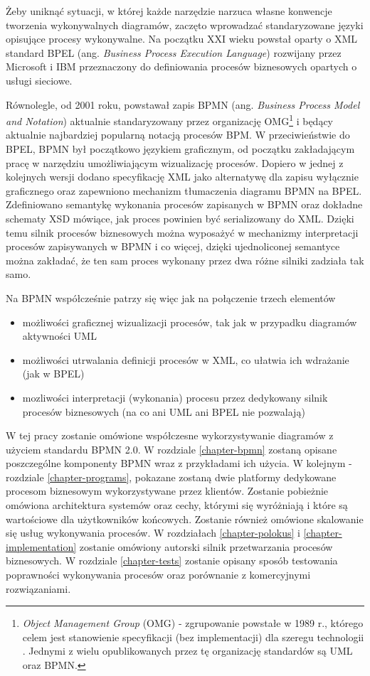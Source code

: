 \documentclass[declaration,shortabstract,mgr]{iithesis}
\newcommand{\bpmn}{BPMN }
\begin{document}
Żeby uniknąć sytuacji, w której każde narzędzie narzuca własne konwencje tworzenia wykonywalnych diagramów, zaczęto wprowadzać standaryzowane języki opisujące procesy wykonywalne. Na początku XXI wieku powstał oparty o XML standard BPEL (ang. \textit{Business Process Execution Language}) rozwijany przez Microsoft i IBM przeznaczony do definiowania procesów biznesowych opartych o usługi sieciowe.

Równolegle, od 2001 roku, powstawał zapis \bpmn (ang. \textit{Business Process Model and Notation}) aktualnie standaryzowany przez organizację OMG\footnote{\textit{Object Management Group} (OMG) - zgrupowanie powstałe w 1989 r., którego celem jest stanowienie specyfikacji (bez implementacji) dla szeregu technologii \cite{omg-wiki}. Jednymi z wielu opublikowanych przez tę organizację standardów są UML oraz BPMN.} i będący aktualnie najbardziej popularną notacją procesów BPM. W przeciwieństwie do BPEL, BPMN był początkowo językiem graficznym, od początku zakładającym pracę w narzędziu umożliwiającym wizualizację procesów. Dopiero w jednej z kolejnych wersji dodano specyfikację XML jako alternatywę dla zapisu wyłącznie graficznego oraz zapewniono mechanizm tłumaczenia diagramu \bpmn na BPEL. Zdefiniowano semantykę wykonania procesów zapisanych w \bpmn oraz dokładne schematy XSD mówiące, jak proces powinien być serializowany do XML. Dzięki temu silnik procesów biznesowych można wyposażyć w mechanizmy interpretacji procesów zapisywanych w \bpmn i co więcej, dzięki ujednoliconej semantyce można zakładać, że ten sam proces wykonany przez dwa różne silniki zadziała tak samo. 

Na \bpmn współcześnie patrzy się więc jak na połączenie trzech elementów

\begin{itemize}
\item możliwości graficznej wizualizacji procesów, tak jak w przypadku diagramów aktywności UML
\item możliwości utrwalania definicji procesów w XML, co ułatwia ich wdrażanie (jak w BPEL)
\item mozliwości interpretacji (wykonania) procesu przez dedykowany silnik procesów biznesowych (na co ani UML ani BPEL nie pozwalają)
\end{itemize}

W tej pracy zostanie omówione współczesne wykorzystywanie diagramów z użyciem standardu \bpmn 2.0. W rozdziale \ref{chapter-bpmn} zostaną opisane poszczególne komponenty \bpmn wraz z przykładami ich użycia. W kolejnym - rozdziale \ref{chapter-programs}, pokazane zostaną dwie platformy dedykowane procesom biznesowym wykorzystywane przez klientów. Zostanie pobieżnie omówiona architektura systemów oraz cechy, którymi się wyróżniają i które są wartościowe dla użytkowników końcowych. Zostanie również omówione skalowanie się usług wykonywania procesów. W rozdziałach \ref{chapter-polokus} i \ref{chapter-implementation} zostanie omówiony autorski silnik przetwarzania procesów biznesowych. W rozdziale \ref{chapter-tests} zostanie opisany sposób testowania poprawności wykonywania procesów oraz porównanie z komercyjnymi rozwiązaniami.
\end{document}
